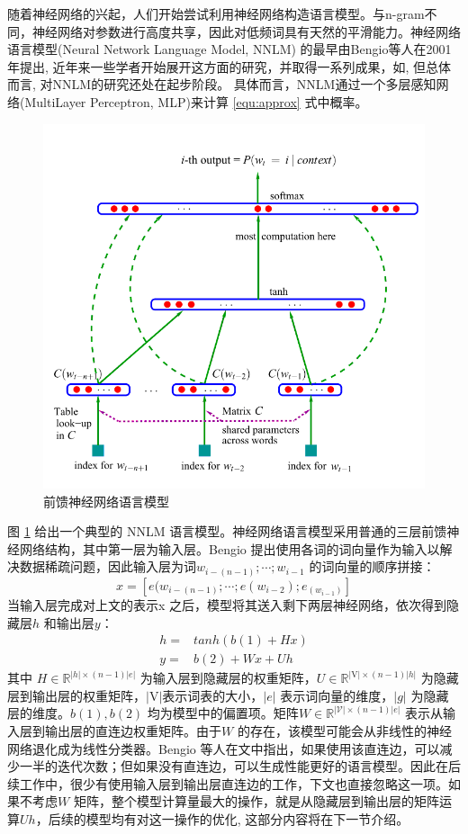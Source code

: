 \documentclass[12pt,a4paper]{article}
\begin{document}
随着神经网络的兴起，人们开始尝试利用神经网络构造语言模型。与n-gram不同，神经网络对参数进行高度共享，因此对低频词具有天然的平滑能力。神经网络语言模型(Neural Network Language Model, NNLM) 的最早由Bengio等人在2001年提出\cite{DBLP:conf/nips/BengioDV00}, 近年来一些学者开始展开这方面的研究，并取得一系列成果，如\cite{DBLP:conf/acl/BaroniDK14,DBLP:journals/sigkdd/BellK07,DBLP:journals/pami/BengioCV13,DBLP:journals/tnn/BengioSF94}, 但总体而言, 对NNLM的研究还处在起步阶段。
具体而言，NNLM通过一个多层感知网络(MultiLayer Perceptron, MLP)来计算 \ref{equ:approx} 式中概率。
\begin{figure}
  \centering
  \includegraphics[width=0.7\linewidth]{./figures/nplm.png}
  \caption{前馈神经网络语言模型}\label{fig:nplm}
\end{figure}
图 \ref{fig:nplm} 给出一个典型的 NNLM 语言模型。神经网络语言模型采用普通的三层前馈神经网络结构，其中第一层为输入层。Bengio 提出使用各词的词向量作为输入以解决数据稀疏问题，因此输入层为词$w_{i-(n-1)}; \cdots;w_{i-1} $ 的词向量的顺序拼接：
\begin{equation}\label{equ:we}
  x = [e(w_{i-(n-1)}; \cdots ; e(w_{i-2}); e_{(w_{i-1})}]
\end{equation}
当输入层完成对上文的表示x 之后，模型将其送入剩下两层神经网络，依次得到隐藏层$h$ 和输出层$y$：
\begin{equation}\label{equ:all_nplm}
\begin{split}
h =& tanh(b(1) + Hx) \\
y =& b(2) +Wx + Uh
\end{split}
\end{equation}
其中 $H \in \mathbb{R}^{|h| \times (n-1)|e|}$ 为输入层到隐藏层的权重矩阵，$U \in \mathbb{R}^{|\mathrm{V}|\times (n-1)|h|}$ 为隐藏层到输出层的权重矩阵，$ |\mathrm{V}|$表示词表的大小，$|e|$ 表示词向量的维度，$|g|$ 为隐藏层的维度。$b(1),b(2)$ 均为模型中的偏置项。矩阵$W \in \mathbb{R}^{|\mathcal{V}|\times (n-1)|e|}$ 表示从输入层到输出层的直连边权重矩阵。由于$W$ 的存在，该模型可能会从非线性的神经网络退化成为线性分类器。Bengio 等人在文中指出，如果使用该直连边，可以减少一半的迭代次数；但如果没有直连边，可以生成性能更好的语言模型。因此在后续工作中，很少有使用输入层到输出层直连边的工作，下文也直接忽略这一项。如果不考虑$W$ 矩阵，整个模型计算量最大的操作，就是从隐藏层到输出层的矩阵运算$Uh$，后续的模型均有对这一操作的优化, 这部分内容将在下一节介绍。
\end{document}
